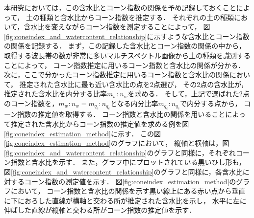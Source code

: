 本研究においては，この含水比とコーン指数の関係を予め記録しておくことによって，
土の種類と含水比からコーン指数を推定する．
それぞれの土の種類において，含水比を変えながらコーン指数を測定することによって，
図\ref{fig:coneindex_and_watercontent_relationship}に示すような含水比とコーン指数の関係を記録する．
まず，この記録した含水比とコーン指数の関係の中から，取得する波長帯の数が非常に多いマルチスペクトル画像から土の種類を識別することによって，
コーン指数推定に用いるコーン指数と含水比の関係が分かる．
次に，ここで分かったコーン指数推定に用いるコーン指数と含水比の関係において，
推定された含水比に最も近い含水比の点を2点選び，
その2点の含水比が，推定された含水比を内分する比率$m_w:n_w$を求める．
そして，上記で選ばれた2点のコーン指数を，$m_w:n_w = m_{q_c}:n_{q_c}$となる内分比率$m_{q_c}:n_{q_c}$で内分する点から，
コーン指数の推定値を取得する．
コーン指数と含水比の関係を用いることによって推定された含水比からコーン指数の推定値を求める例を図\ref{fig:coneindex_estimation_method}に示す．
この図\ref{fig:coneindex_estimation_method}のグラフにおいて，
縦軸と横軸は，図\ref{fig:coneindex_and_watercontent_relationship}のグラフと同様に，それぞれコーン指数と含水比を示す．
また，グラフ中にプロットされている黒いひし形も，図\ref{fig:coneindex_and_watercontent_relationship}のグラフと同様に，各含水比に対するコーン指数の測定値を示す．
図\ref{fig:coneindex_estimation_method}のグラフにおいて，
コーン指数と含水比の関係を示す黒い線上にある赤い点から垂直に下におろした直線が横軸と交わる所が推定された含水比を示し，
水平に左に伸ばした直線が縦軸と交わる所がコーン指数の推定値を示す．

